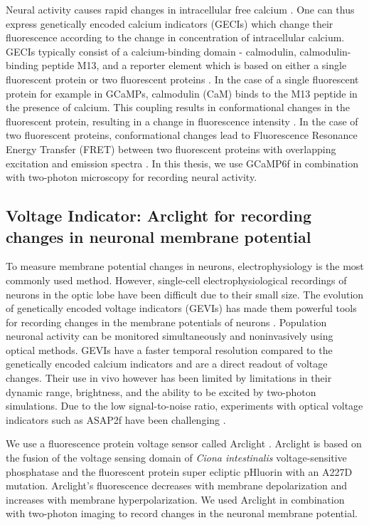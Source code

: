 Neural activity causes rapid changes in intracellular free calcium \parencite{Baker1971, Sabatini2002, Egelhaaf1995}. One can thus express genetically encoded calcium indicators (GECIs) which change their fluorescence according to the change in concentration of intracellular calcium. GECIs typically consist of a calcium-binding domain - calmodulin, calmodulin-binding peptide M13, and a reporter element which is based on either a single fluorescent protein or two fluorescent proteins \parencite{Broussard2014}. In the case of a single fluorescent protein for example in GCaMPs, calmodulin (CaM) binds to the M13 peptide in the presence of calcium. This coupling results in conformational changes in the fluorescent protein, resulting in a change in fluorescence intensity \parencite{Nagai2001}. In the case of two fluorescent proteins, conformational changes lead to Fluorescence Resonance Energy Transfer (FRET) between two fluorescent proteins with overlapping excitation and emission spectra \parencite{Miyawaki1997}. In this thesis, we use GCaMP6f  \parencite{Chen2013} in combination with two-photon microscopy for recording neural activity.

\subsection{Voltage Indicator: Arclight for recording changes in neuronal membrane potential}
To measure membrane potential changes in neurons, electrophysiology is the most commonly used method. However, single-cell electrophysiological recordings of neurons in the optic lobe have been difficult due to their small size. The evolution of genetically encoded voltage indicators (GEVIs) has made them powerful tools for recording changes in the membrane potentials of neurons \parencite{Yang2016}. Population neuronal activity can be monitored simultaneously and noninvasively using optical methods. GEVIs have a faster temporal resolution compared to the genetically encoded calcium indicators and are a direct readout of voltage changes. Their use in vivo however has been limited by limitations in their dynamic range, brightness, and the ability to be excited by two-photon simulations. Due to the low signal-to-noise ratio, experiments with optical voltage indicators such as ASAP2f have been challenging \parencite{Yang2016}.

We use a fluorescence protein voltage sensor called Arclight \parencite{Jin2012}. Arclight is based on the fusion of the voltage sensing domain of \textit{Ciona intestinalis} voltage-sensitive phosphatase \parencite{Murata2005} and the fluorescent protein super ecliptic pHluorin with an A227D mutation. Arclight's fluorescence decreases with membrane depolarization and increases with membrane hyperpolarization. We used Arclight in combination with two-photon imaging to record changes in the neuronal membrane potential.

